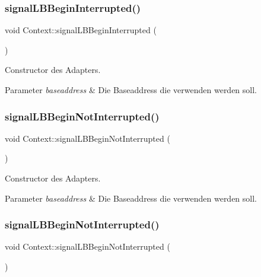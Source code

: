 \subsubsection{\texorpdfstring{signal\+L\+B\+Begin\+Interrupted()}{signalLBBeginInterrupted()}\hspace{0.1cm}{\footnotesize\ttfamily [2/2]}}
{\footnotesize\ttfamily void Context\+::signal\+L\+B\+Begin\+Interrupted (\begin{DoxyParamCaption}{ }\end{DoxyParamCaption})}

Constructor des Adapters.


\begin{DoxyParams}{Parameter}
{\em baseaddress} & Die Baseaddress die verwenden werden soll. \\
\hline
\end{DoxyParams}
\hypertarget{class_context_a9528945480d5072126031a6ce0d20b99}{}\label{class_context_a9528945480d5072126031a6ce0d20b99} 
\subsubsection{\texorpdfstring{signal\+L\+B\+Begin\+Not\+Interrupted()}{signalLBBeginNotInterrupted()}\hspace{0.1cm}{\footnotesize\ttfamily [1/2]}}
{\footnotesize\ttfamily void Context\+::signal\+L\+B\+Begin\+Not\+Interrupted (\begin{DoxyParamCaption}{ }\end{DoxyParamCaption})}

Constructor des Adapters.


\begin{DoxyParams}{Parameter}
{\em baseaddress} & Die Baseaddress die verwenden werden soll. \\
\hline
\end{DoxyParams}
\hypertarget{class_context_a9528945480d5072126031a6ce0d20b99}{}\label{class_context_a9528945480d5072126031a6ce0d20b99} 
\subsubsection{\texorpdfstring{signal\+L\+B\+Begin\+Not\+Interrupted()}{signalLBBeginNotInterrupted()}\hspace{0.1cm}{\footnotesize\ttfamily [2/2]}}
{\footnotesize\ttfamily void Context\+::signal\+L\+B\+Begin\+Not\+Interrupted (\begin{DoxyParamCaption}{ }\end{DoxyParamCaption})}

